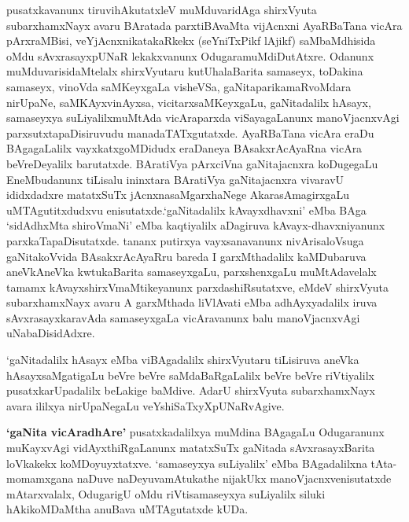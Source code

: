 {pusatxkavanunx tiruvihAkutatxleV muMduvaridAga shirxVyuta subarxhamxNayx avaru BAratada parxtiBAvaMta vijAcnxni AyaRBaTana vicAra pArxraMBisi, veYjAcnxnikatakaRkekx (seYniTxPikf lAjikf) saMbaMdhisida oMdu sAvxrasayxpUNaR lekakxvanunx Odugara\break muMdiDutAtxre. Odanunx muMduvarisidaMtelalx shirxVyutaru kutUhalaBarita samaseyx, toDakina samaseyx, vinoVda saMKeyxgaLa visheVSa, gaNitaparikamaRvoMdara nirUpaNe,\- saMKAyxvinAyxsa, vicitarxsaMKeyxgaLu, gaNitadalilx hAsayx, samaseyxya suLiyalilx\break muMtAda vicAraparxda viSayagaLanunx manoVjacnxvAgi parxsutxtapaDisiruvudu mana\-daTATxgutatxde. AyaRBaTana vicAra eraDu BAgagaLalilx vayxkatxgoMDidudx eraDaneya BAsakxrAcAyaRna vicAra beVreDeyalilx barutatxde. BAratiVya pArxciVna gaNita\-jacnxra koDugegaLu EneMbudanunx tiLisalu ininxtara BAratiVya gaNitajacnxra vivaravU ididxdadxre matatxSuTx jAcnxnasaMgarxhaNege AkarasAmagirxgaLu uMTAgutitxdudxvu enisutatxde.\break `gaNitadalilx kAvayxdhavxni' eMba BAga `sidAdhxMta shiroVmaNi' eMba kaqtiyalilx aDagi\-ruva kAvayx-dhavxniyanunx parxkaTapaDisutatxde. tananx putirxya vayxsanavanunx nivArisa\break loVsuga gaNitakoVvida BAsakxrAcAyaRru bareda I garxMthadalilx kaMDubaruva aneVkAneVka kwtukaBarita samaseyxgaLu, parxshenxgaLu muMtAdavelalx tamamx kAvayx\break shirxVmaMtikeyanunx parxdashiRsutatxve, eMdeV shirxVyuta subarxhamxNayx avaru A garxMthada liVlAvati eMba adhAyxyadalilx iruva sAvxrasayxkaravAda samaseyxgaLa vicAravanunx balu manoVjacnxvAgi uNabaDisidAdxre.

\bigskip

`gaNitadalilx hAsayx eMba viBAgadalilx shirxVyutaru tiLisiruva aneVka hAsayx\-saMgatigaLu beVre beVre saMdaBaRgaLalilx beVre beVre riVtiyalilx pusatxkarUpadalilx beLakige baMdive. AdarU shirxVyuta subarxhamxNayx avara ililxya nirUpaNegaLu veYshiSaTxyXpUNaRvAgive.

\bigskip

{\bf `gaNita vicAradhAre'} pusatxkadalilxya muMdina BAgagaLu Odugaranunx muKayx\-vAgi vidAyxthiRgaLanunx matatxSuTx gaNitada sAvxrasayxBarita loVkakekx koMDoyuyxtatxve. `samaseyxya suLiyalilx' eMba BAgadalilxna tAta-momamxgana naDuve naDeyuva\break mAtukathe nijakUkx manoVjacnxvenisutatxde mAtarxvalalx, OdugarigU oMdu riVti\break samaseyxya suLiyalilx siluki hAkikoMDaMtha anuBava uMTAgutatxde kUDa.

\bigskip

}
